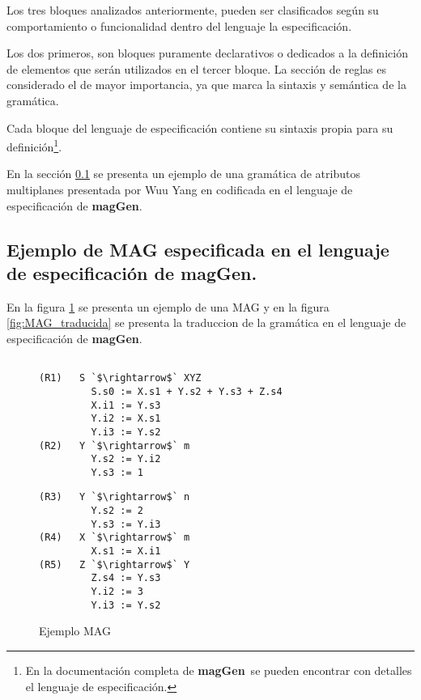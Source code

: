\documentclass[runningheads,a4paper]{llncs}
\newcommand{\maggen}{\textbf{magGen}}
\begin{document}
Los tres bloques analizados anteriormente, pueden ser clasificados según su comportamiento o funcionalidad dentro del lenguaje la especificación.

Los dos primeros, son bloques puramente declarativos o dedicados a la definición de elementos que serán utilizados en el tercer bloque. La sección de reglas es considerado el de mayor importancia, ya que marca la sintaxis y semántica de la gramática.

Cada bloque del lenguaje de especificación contiene su sintaxis propia para su definición\footnote{En la documentación completa de \maggen\ se pueden encontrar con detalles el lenguaje de especificación.}.

En la sección \ref{ej:agwuuyang} se presenta un ejemplo de una gramática de atributos multiplanes presentada por Wuu Yang en \cite{wuu-yang1} codificada en el lenguaje de especificación de \maggen.

\subsection{Ejemplo de MAG especificada en el lenguaje de especificación de \maggen.}
\label{ej:agwuuyang}
\vspace{-0.22cm}
En la figura \ref{fig:mag_wuu_yang} se presenta un ejemplo de una MAG y en la figura \ref{fig:MAG_traducida} se presenta la traduccion de la gramática en el lenguaje de especificación de \maggen.

\begin{figure}[!ht]
\vspace{-0.5cm}
\begin{minipage}{0.45\textwidth}
\begin{center} 
\begin{lstlisting}[columns=fullflexible, backgroundcolor=\color{white}]

(R1)   S `$\rightarrow$` XYZ      
         S.s0 := X.s1 + Y.s2 + Y.s3 + Z.s4
         X.i1 := Y.s3  
         Y.i2 := X.s1
         Y.i3 := Y.s2
(R2)   Y `$\rightarrow$` m        
         Y.s2 := Y.i2
         Y.s3 := 1

\end{lstlisting} 
\end{center}
\end{minipage}
\hspace{0.6cm}\begin{minipage}{0.45\textwidth}
\begin{center}
\begin{lstlisting}[columns=fullflexible, backgroundcolor=\color{white}]
(R3)   Y `$\rightarrow$` n        
         Y.s2 := 2
         Y.s3 := Y.i3
(R4)   X `$\rightarrow$` m        
         X.s1 := X.i1
(R5)   Z `$\rightarrow$` Y        
         Z.s4 := Y.s3
         Y.i2 := 3
         Y.i3 := Y.s2
\end{lstlisting} 
\end{center}
\end{minipage}
\vspace{-0,5cm}
\caption{\label{fig:mag_wuu_yang}Ejemplo MAG}
\end{figure}
\end{document}

